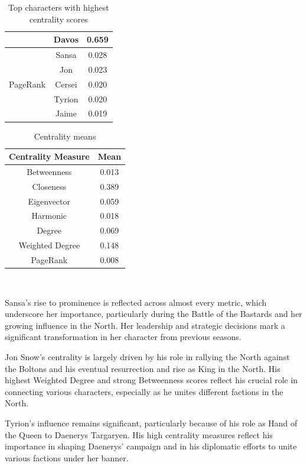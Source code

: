 \documentclass[10pt,twocolumn,letterpaper]{article}
\begin{document}
\begin{table}[!h]
\begin{tabular}{c|c|c}
                    & Davos & 0.659 \\
        \hline
                    & Sansa & 0.028 \\
                    & Jon & 0.023 \\
        PageRank    & Cersei & 0.020 \\
                    & Tyrion & 0.020 \\
                    & Jaime & 0.019 \\
        \hline
    \end{tabular}
    \vspace{0.2cm}
    \caption{Top characters with highest centrality scores}
    \label{tab:my_label}
\end{table}




\begin{table}[!h]
    \centering
    \begin{tabular}{c|c}
        Centrality Measure & Mean  \\
        \hline
        Betweenness & 0.013 \\
        Closeness & 0.389 \\
        Eigenvector & 0.059 \\
        Harmonic & 0.018 \\
        Degree & 0.069 \\
        Weighted Degree & 0.148 \\
        PageRank & 0.008 \\
        \hline 
    \end{tabular} \\
    \caption{Centrality means}
    \label{tab:my_label}
\end{table}

Sansa's rise to prominence is reflected across almost every metric, which underscore her importance, particularly during the Battle of the Bastards and her growing influence in the North. Her leadership and strategic decisions mark a significant transformation in her character from previous seasons.

Jon Snow's centrality is largely driven by his role in rallying the North against the Boltons and his eventual resurrection and rise as King in the North. His highest Weighted Degree and strong Betweenness scores reflect his crucial role in connecting various characters, especially as he unites different factions in the North. 

Tyrion's influence remains significant, particularly because of his role as Hand of the Queen to Daenerys Targaryen. His high centrality measures reflect his importance in shaping Daenerys' campaign and in his diplomatic efforts to unite various factions under her banner.
\end{document}
